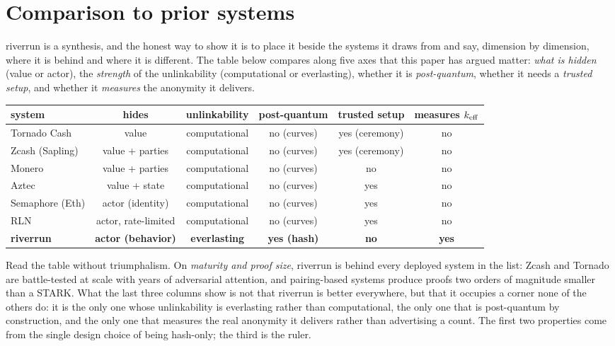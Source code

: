 \documentclass[11pt]{article}
\begin{document}
\section{Comparison to prior systems}
\label{sec:comparison}

riverrun is a synthesis, and the honest way to show it is to place it beside the systems it
draws from and say, dimension by dimension, where it is behind and where it is different.
The table below compares along five axes that this paper has argued matter: \emph{what is
hidden} (value or actor), the \emph{strength} of the unlinkability (computational or
everlasting), whether it is \emph{post-quantum}, whether it needs a \emph{trusted setup},
and whether it \emph{measures} the anonymity it delivers.

\begin{center}\small
\renewcommand{\arraystretch}{1.25}
\begin{tabular}{@{}lccccc@{}}
\toprule
system & hides & unlinkability & post-quantum & trusted setup & measures $k_{\mathrm{eff}}$ \\
\midrule
Tornado Cash & value & computational & no (curves) & yes (ceremony) & no \\
Zcash (Sapling) & value + parties & computational & no (curves) & yes (ceremony) & no \\
Monero & value + parties & computational & no (curves) & no & no \\
Aztec & value + state & computational & no (curves) & yes & no \\
Semaphore (Eth) & actor (identity) & computational & no (curves) & yes & no \\
RLN & actor, rate-limited & computational & no (curves) & yes & no \\
\textbf{riverrun} & \textbf{actor (behavior)} & \textbf{everlasting} & \textbf{yes (hash)} &
\textbf{no} & \textbf{yes} \\
\bottomrule
\end{tabular}
\end{center}

Read the table without triumphalism. On \emph{maturity and proof size}, riverrun is behind
every deployed system in the list: Zcash and Tornado are battle-tested at scale with years
of adversarial attention, and pairing-based systems produce proofs two orders of magnitude
smaller than a STARK. What the last three columns show is not that riverrun is better
everywhere, but that it occupies a corner none of the others do: it is the only one whose
unlinkability is everlasting rather than computational, the only one that is post-quantum by
construction, and the only one that measures the real anonymity it delivers rather than
advertising a count. The first two properties come from the single design choice of being
hash-only; the third is the ruler.
\end{document}
